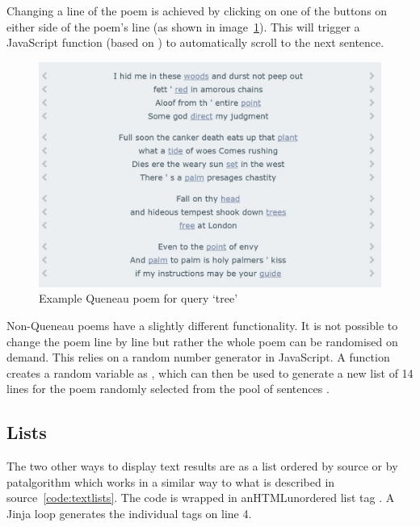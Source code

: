 Changing a line of the poem is achieved by clicking on one of the buttons on either side of the poem's line (as shown in image~\ref{img:qpoemtree}). This will trigger a JavaScript function (based on \autocite{DYNWEB2016}) to automatically scroll to the next sentence. 

\begin{figure}[!htbp] %
  \centering
  \includegraphics[width=\linewidth]{images/qpoemtree}
\caption[Queneau poem for query `tree']{Example Queneau poem for query `tree'}
\label{img:qpoemtree}
\end{figure}

Non-Queneau poems have a slightly different functionality. It is not possible to change the poem line by line but rather the whole poem can be randomised on demand. This relies on a random number generator in JavaScript. A function  creates a random variable  as , which can then be used to generate a new list of 14 lines for the poem randomly selected from the pool of sentences .


\subsection{Lists}

The two other ways to display text results are as a list ordered by source or by patalgorithm which works in a similar way to what is described in source~\ref{code:textlists}. The code is wrapped in an\ac{HTML}unordered list tag . A Jinja  loop generates the individual  tags on line 4.

